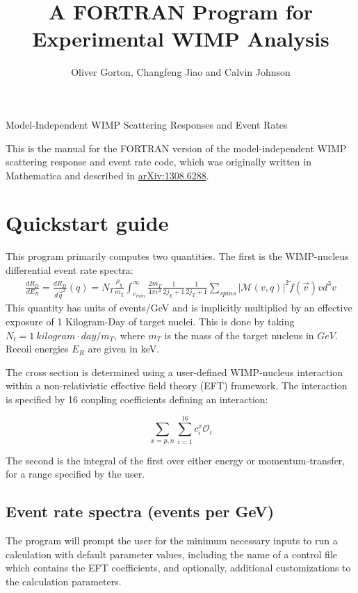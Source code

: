 \documentclass[11pt]{amsart}
\title{A FORTRAN Program for Experimental WIMP Analysis}
\author{Oliver Gorton, Changfeng Jiao and Calvin Johnson}
\begin{document}
\maketitle

{

\centering

Model-Independent WIMP Scattering Responses and Event Rates

}

\tableofcontents

This is the manual for the FORTRAN version of the model-independent WIMP scattering response and event rate code, which was originally written in Mathematica and described in \href{http://arxiv.org/abs/1308.6288v1}{arXiv:1308.6288}.

\clearpage

\section{Quickstart guide}
This program primarily computes two quantities. The first is the WIMP-nucleus
differential event rate spectra:
\begin{equation}
\begin{split}
        \frac{dR_D}{dE_R} = \frac{dR_D}{d\vec{q}^2}(q)
	= N_T\frac{\rho_\chi}{m_\chi}\int_{v_{min}}^\infty \frac{2m_T}{4\pi v^2}\frac{1}{2j_\chi+1}\frac{1}{2j_T+1}\sum_{spins}|\mathcal{M}(v,q)|^2  \tilde{f}(\vec{v})vd^3v
\end{split}
\end{equation}
This quantity has units of events/GeV and is implicitly multiplied by
an effective exposure of 1 Kilogram-Day of target nuclei. This is done by
taking $N_t = 1\ kilogram\cdot day / m_T$, where $m_T$ is the mass of the target
nucleus in $GeV$. Recoil energies $E_R$ are given in keV.

The cross section is determined using a user-defined WIMP-nucleus interaction
within a non-relativistic effective field theory (EFT) framework. The
interaction is specified by 16 coupling coefficients defining an interaction:

\begin{equation}
	\sum_{x=p,n}\sum_{i=1}^{16} c_i^x \mathcal{O}_i
\end{equation}

The second is the integral of the first over either energy or momentum-transfer,
for a range specified by the user. 

\subsection{Event rate spectra (events per GeV)}
The program will prompt the user for 
the minimum necessary inputs to run a calculation with default parameter 
values, including the name of a control file which contains the EFT
coefficients, and optionally, additional customizations to the calculation
parameters.
\end{document}
